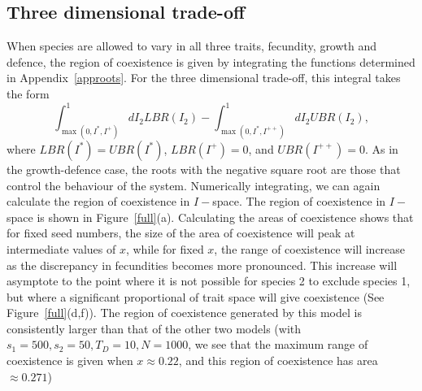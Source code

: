 \documentclass[preprint,10pt,reqno]{amsart}
\begin{document}
\subsection{Three dimensional trade-off}
When species are allowed to vary in all three traits, fecundity, growth and defence, the region of coexistence is given by integrating the functions determined in Appendix~\ref{approots}. For the three dimensional trade-off, this integral takes the form
\begin{equation}
\int_{\max(0,I^*,I^+)}^1 dI_2 LBR(I_2) - \int_{\max(0,I^*,I^{++})}^1 dI_2 UBR(I_2),
\end{equation}
where $LBR(I^*)=UBR(I^*)$, $LBR(I^+)=0$, and $UBR(I^{++})=0$. As in the growth-defence case, the roots with the negative square root are those that control the behaviour of the system. Numerically integrating, we can again calculate the region of coexistence in $I-$space. The region of coexistence in $I-$space is shown in Figure~\ref{full}(a). Calculating the areas of coexistence shows that for fixed seed numbers, the size of the area of coexistence will peak at intermediate values of $x$, while for fixed $x$, the range of coexistence will increase as the discrepancy in fecundities becomes more pronounced. This increase will asymptote to the point where it is not possible for species 2 to exclude species 1, but where a significant proportional of trait space will give coexistence (See Figure~\ref{full}(d,f)). The region of coexistence generated by this model is consistently larger than that of the other two models (with $s_1=500,s_2=50,T_D=10,N=1000$, we see that the maximum range of coexistence is given when $x\approx 0.22$, and this region of coexistence has area $\approx 0.271$)
\end{document}
